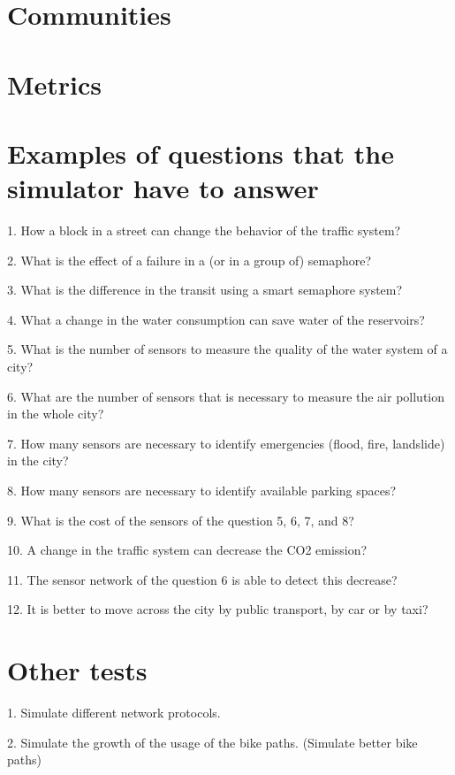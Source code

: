 \documentclass[
journal=jacsat, %
manuscript=article]{achemso}
\begin{document}
\section{Communities}



\section{Metrics}


\section{Examples of questions that the simulator have to answer}

1. How a block in a street can change the behavior of the traffic system?

2. What is the effect of a failure in a (or in a group of) semaphore?

3. What is the difference in the transit using a smart semaphore system?

4. What a change in the water consumption can save water of the reservoirs?

5. What is the number of sensors to measure the quality of the water system of 
a city?

6. What are the number of sensors that is necessary to measure the air 
pollution in the whole city?

7. How many sensors are necessary to identify emergencies (flood, fire, 
landslide) in the city?

8. How many sensors are necessary to identify available parking spaces?

9. What is the cost of the sensors of the question 5, 6, 7, and 8?

10. A change in the traffic system can decrease the CO2 emission?

11. The sensor network of the question 6 is able to detect this decrease?

12. It is better to move across the city by public transport, by car or by taxi?

\section{Other tests}


1. Simulate different network protocols.

2. Simulate the growth of the usage of the bike paths. (Simulate better bike paths)
\end{document}
